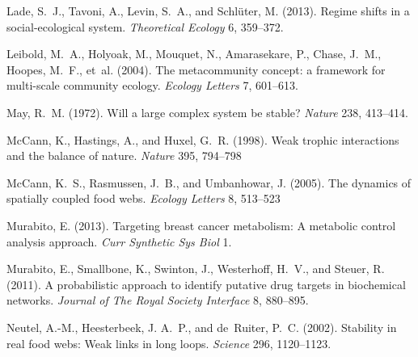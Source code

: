 \documentclass{article}
\begin{document}
\begin{thebibliography}{85}
Lade, S.~J., Tavoni, A., Levin, S.~A., and Schl{\"u}ter, M. (2013).
\newblock Regime shifts in a social-ecological system.
\newblock \emph{Theoretical Ecology} 6, 359--372.
\newblock {}

Leibold, M.~A., Holyoak, M., Mouquet, N., Amarasekare, P., Chase, J.~M.,
  Hoopes, M.~F., et~al. (2004).
\newblock The metacommunity concept: a framework for multi-scale community
  ecology.
\newblock \emph{Ecology Letters} 7, 601--613.
\newblock {}

May, R.~M. (1972).
\newblock Will a large complex system be stable?
\newblock \emph{Nature} 238, 413--414.
\newblock {}

McCann, K., Hastings, A., and Huxel, G.~R. (1998).
\newblock Weak trophic interactions and the balance of nature.
\newblock \emph{Nature} 395, 794--798

McCann, K.~S., Rasmussen, J.~B., and Umbanhowar, J. (2005).
\newblock The dynamics of spatially coupled food webs.
\newblock \emph{Ecology Letters} 8, 513--523

Murabito, E. (2013).
\newblock Targeting breast cancer metabolism: A metabolic control analysis
  approach.
\newblock \emph{Curr Synthetic Sys Biol} 1.
\newblock {}

Murabito, E., Smallbone, K., Swinton, J., Westerhoff, H.~V., and Steuer, R.
  (2011).
\newblock A probabilistic approach to identify putative drug targets in
  biochemical networks.
\newblock \emph{Journal of The Royal Society Interface} 8, 880--895.
\newblock {}

Neutel, A.-M., Heesterbeek, J. A.~P., and de~Ruiter, P.~C. (2002).
\newblock Stability in real food webs: Weak links in long loops.
\newblock \emph{Science} 296, 1120--1123.
\newblock {}


\end{thebibliography}
\end{document}
